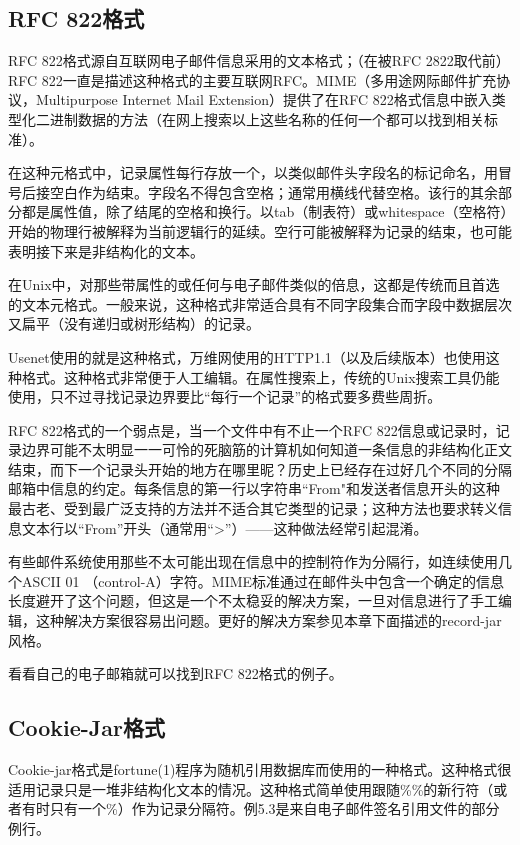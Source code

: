\documentclass[12pt,oneside]{book}
\begin{document}
\subsection{RFC 822格式}
RFC 822格式源自互联网电子邮件信息采用的文本格式；（在被RFC 2822取代前）RFC 822一直是描述这种格式的主要互联网RFC。MIME（多用途网际邮件扩充协议，Multipurpose Internet Mail Extension）提供了在RFC 822格式信息中嵌入类型化二进制数据的方法（在网上搜索以上这些名称的任何一个都可以找到相关标准）。

在这种元格式中，记录属性每行存放一个，以类似邮件头字段名的标记命名，用冒号后接空白作为结束。字段名不得包含空格；通常用横线代替空格。该行的其余部分都是属性值，除了结尾的空格和换行。以tab（制表符）或whitespace（空格符）开始的物理行被解释为当前逻辑行的延续。空行可能被解释为记录的结束，也可能表明接下来是非结构化的文本。

在Unix中，对那些带属性的或任何与电子邮件类似的倍息，这都是传统而且首选的文本元格式。一般来说，这种格式非常适合具有不同字段集合而字段中数据层次又扁平（没有递归或树形结构）的记录。

Usenet使用的就是这种格式，万维网使用的HTTP1.1（以及后续版本）也使用这种格式。这种格式非常便于人工编辑。在属性搜索上，传统的Unix搜索工具仍能使用，只不过寻找记录边界要比“每行一个记录”的格式要多费些周折。

RFC 822格式的一个弱点是，当一个文件中有不止一个RFC 822信息或记录时，记录边界可能不太明显一一可怜的死脑筋的计算机如何知道一条信息的非结构化正文结束，而下一个记录头开始的地方在哪里昵？历史上已经存在过好几个不同的分隔邮箱中信息的约定。每条信息的第一行以字符串“From"和发送者信息开头的这种最古老、受到最广泛支持的方法并不适合其它类型的记录；这种方法也要求转义信息文本行以“From”开头（通常用“>”）——这种做法经常引起混淆。

有些邮件系统使用那些不太可能出现在信息中的控制符作为分隔行，如连续使用几个ASCII 01 （control-A）字符。MIME标准通过在邮件头中包含一个确定的信息长度避开了这个问题，但这是一个不太稳妥的解决方案，一旦对信息进行了手工编辑，这种解决方案很容易出问题。更好的解决方案参见本章下面描述的record-jar风格。

看看自己的电子邮箱就可以找到RFC 822格式的例子。


\subsection{Cookie-Jar格式}
Cookie-jar格式是fortune(1)程序为随机引用数据库而使用的一种格式。这种格式很适用记录只是一堆非结构化文本的情况。这种格式简单使用跟随\%{}\%{}的新行符（或者有时只有一个\%{}）作为记录分隔符。例5.3是来自电子邮件签名引用文件的部分例行。
\end{document}
